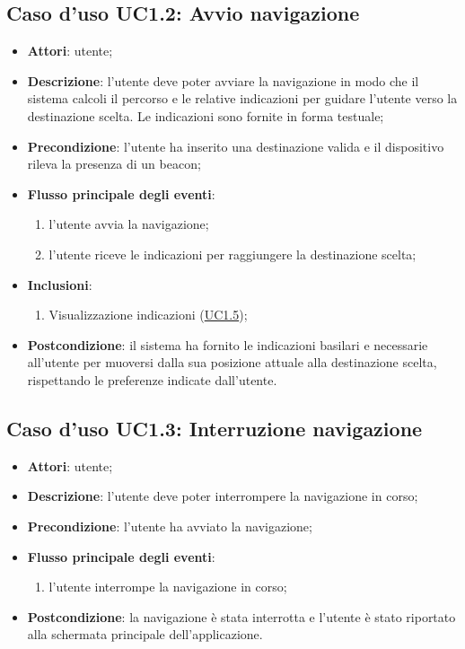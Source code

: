 \documentclass[../AnalisiDeiRequisiti.tex]{subfiles}
\begin{document}
\subsection{Caso d'uso UC1.2: Avvio navigazione}
\begin{itemize}
\item \textbf{Attori}: utente;
\item \textbf{Descrizione}: l'utente deve poter avviare la navigazione in modo che il sistema calcoli il percorso e le relative indicazioni per guidare l'utente verso la destinazione scelta. Le indicazioni sono fornite in forma testuale; 
      \item \textbf{Precondizione}: l'utente ha inserito una destinazione valida e il dispositivo rileva la presenza di un beacon;

        \item \textbf{Flusso principale degli eventi}:
          \begin{enumerate}
          \item l'utente avvia la navigazione;
          \item l'utente riceve le indicazioni per raggiungere la destinazione scelta;

      \end{enumerate}
    \item \textbf{Inclusioni}:
      \begin{enumerate}
          \item Visualizzazione indicazioni (\hyperlink{UC1.5}{UC1.5});

      \end{enumerate}
    \item \textbf{Postcondizione}: il sistema ha fornito le indicazioni basilari  e necessarie all'utente per muoversi dalla sua posizione attuale alla destinazione scelta, rispettando le preferenze indicate dall'utente.
  \end{itemize}
\hypertarget{UC1.3}{}
\subsection{Caso d'uso UC1.3: Interruzione navigazione}
\begin{itemize}
\item \textbf{Attori}: utente;
\item \textbf{Descrizione}: l'utente deve poter interrompere la navigazione in corso; 
      \item \textbf{Precondizione}: l'utente ha avviato la navigazione;

        \item \textbf{Flusso principale degli eventi}:
          \begin{enumerate}
          \item l'utente interrompe la navigazione in corso;

      \end{enumerate}
    \item \textbf{Postcondizione}: la navigazione è stata interrotta e l'utente è stato riportato alla schermata principale dell'applicazione.
  \end{itemize}
\hypertarget{UC1.4}{}
\end{document}

